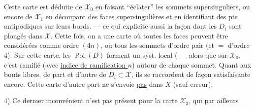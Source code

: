 Cette carte  est déduite de $\mathcal X_0$ en faisant ``éclater'' les  sommets supersinguliers, ou encore de $\mathcal X_1$ en découpant  des faces supersingulières et en identifiant des pts antipodiques sur leurs bords. --- ce qui explicite aussi la façon dont les $D_i$ sont plongés dans $\mathcal X$. Cette fois, on a une carte où toutes les faces peuvent être considérées comme  ordre  $(4n)$, où tous les sommets d'ordre pair (et $=$ d'ordre $4$). Sur cette carte, les $\operatorname{Pol}(D)$ forment un syst. local ( --- alors que sur $\mathcal X_0$, c'est ramifié (avec \uline{indice de ramification $n$}) autour de chaque sommet. Quant aux bouts libres, de part et d'autre de $D_i\subset\mathcal X$, ils se raccordent de façon satisfaisante encore. Cette carte d'autre part ne s'envoie \uline{pas} dans $X$ (sauf erreur).


4) Ce dernier inconvénient n'est pas présent pour la carte $\mathcal X_3$, qui  par ailleurs
